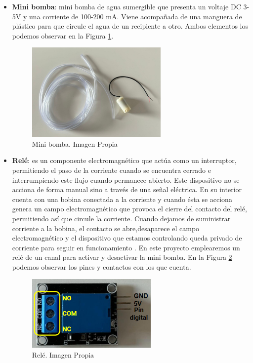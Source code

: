 \begin{itemize}
    \item \textbf{Mini bomba}: mini bomba de agua sumergible que presenta un voltaje DC 3-5V y una corriente de 100-200 mA. Viene acompañada de una manguera de plástico para que circule el agua de un recipiente a otro. Ambos elementos los podemos observar en la Figura \ref{fig:mini_bomba}.
    \begin{figure}[h]
    \centering
    \includegraphics[width=0.65\textwidth]{img/bomba.jpg}
    \caption{Mini bomba. Imagen Propia}
    \label{fig:mini_bomba}
\end{figure}

    \item \textbf{Relé}: es un componente electromagnético que actúa como un interruptor, permitiendo el paso de la corriente cuando se encuentra cerrado e interrumpiendo este flujo cuando permanece abierto. Este dispositivo no se acciona de forma manual sino a través de una señal eléctrica. En su interior cuenta con una bobina conectada a la corriente y cuando ésta se acciona genera un campo electromagnético que provoca el cierre del contacto del relé, permitiendo así que circule la corriente. Cuando dejamos de suministrar corriente a la bobina, el contacto se abre,desaparece el campo electromagnético y el dispositivo que estamos controlando queda privado de corriente para seguir en funcionamiento \cite{rele}. En este proyecto emplearemos un relé de un canal para activar y desactivar la mini bomba. En la Figura \ref{fig:rele} podemos observar los pines y contactos con los que cuenta.
    \begin{figure}[h]
    \centering
    \includegraphics[width=0.6\textwidth]{img/relepartes.PNG}
    \caption{Relé. Imagen Propia}
    \label{fig:rele}
\end{figure}


\end{itemize}
